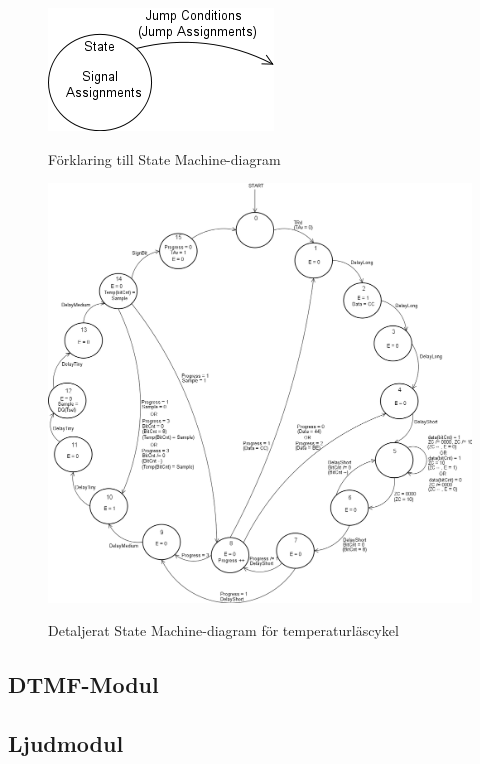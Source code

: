 \documentclass[a4paper,11pt]{article}
\begin{document}
	\begin{figure}[ht!tb]
	  \centering
	      \includegraphics[scale=0.5, angle=0]{StateMachineExplained.png}
		\label{fig:SMExp}
	  	\caption{Förklaring till State Machine-diagram}
	\end{figure}

	\begin{figure}[ht!tb]
	  \centering
	      \includegraphics[scale=0.4, angle=0]{TempStateMachineDiagram.png}
		\label{fig:TempSM}
	  	\caption{Detaljerat State Machine-diagram för temperaturläscykel}
	\end{figure}

		\subsection{DTMF-Modul}
		\subsection{Ljudmodul}
\end{document}
